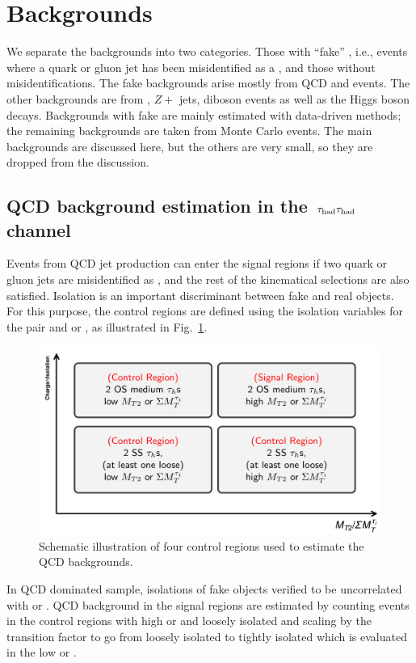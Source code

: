 \section{Backgrounds}
\label{sect:bkg}
We separate the backgrounds into two categories.  Those with 
``fake'' \Tau, i.e., events where a quark or gluon jet has been misidentified
as a \Tau, and those without \Tau misidentifications.  
The fake \Tau backgrounds arise mostly from QCD and \wjets events.  The 
other backgrounds are from \ttbar, $Z+$ jets, diboson events as well as the Higgs boson decays.
Backgrounds with fake \Tau are mainly estimated with data-driven methods; the 
remaining backgrounds are taken from Monte Carlo events. The main backgrounds
are discussed here, but the others are very small, so they are dropped from the 
discussion.

\subsection{\texorpdfstring{QCD background estimation in the $\,\tau_{\rm had}\tau_{\rm had}$ channel}{QCD background estimation in the tau-tau channel}}
\label{sect:bkgQCD}
Events from QCD jet production can enter the signal regions if two quark or gluon jets are 
misidentified as \Tau, and the rest of the kinematical selections are also 
satisfied.  
Isolation is an important 
discriminant between fake and real \Tau objects. For this purpose, the control regions are defined using the isolation variables for the \Tau 
pair and \mttwo or \SumMT, as illustrated in Fig.~\ref{fig:ABCDQCD}. 
\begin{figure}[!Hhtb]
\centering
\includegraphics[angle=0,scale=0.30]{Bkg/ABCD.png}
\caption{Schematic illustration of four control regions used to estimate the QCD backgrounds.}
\label{fig:ABCDQCD}
\end{figure}
In QCD dominated sample, isolations of fake \Tau objects verified 
to be uncorrelated with \mttwo or \SumMT.
QCD background in the signal regions are estimated by counting events in the control regions with high \mttwo or \SumMT and loosely isolated \Tau
and scaling by the transition factor to go from loosely isolated to tightly isolated \Tau which is evaluated in the low \mttwo or \SumMT.

